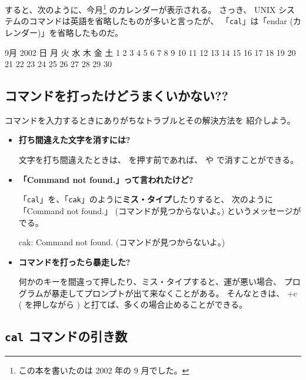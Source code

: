 \begin{progls}
\end{progls}

すると、次のように、今月\footnote{この本を書いたのは 2002 年の 9 月でした。}
のカレンダーが表示される。
さっき、 UNIX システムのコマンドは英語を省略したものが多いと言ったが、
「\texttt{cal}」は「endar (カレンダー)」を省略したものだ。

\begin{progls}
      9月 2002
日 月 火 水 木 金 土
 1  2  3  4  5  6  7
 8  9 10 11 12 13 14
15 16 17 18 19 20 21
22 23 24 25 26 27 28
29 30

%
\end{progls}

\subsection{コマンドを打ったけどうまくいかない??}

コマンドを入力するときにありがちなトラブルとその解決方法を
紹介しよう。

\begin{itemize}
\item \textbf{打ち間違えた文字を消すには?}

文字を打ち間違えたときは、 \retrn を押す前であれば、
  や  で消すことができる。

\item \textbf{「Command not found.」って言われたけど?}

「\texttt{cal}」を、「\texttt{cak}」のように\textbf{ミス・タイプ}したりすると、
次のように「Command not found.」
 (コマンドが見つからないよ。) というメッセージがでる。

\begin{progls}
cak: Command not found. \textnormal{(コマンドが見つからないよ。)}
%
\end{progls}

\item \textbf{コマンドを打ったら暴走した?}

何かのキーを間違って押したり、ミス・タイプすると、運が悪い場合、
プログラムが暴走してプロンプトが出て来なくことがある。
そんなときは、 +c ( を押しながら )
と打てば、多くの場合止めることができる。
\end{itemize}

\subsection{\texttt{cal} コマンドの引き数}

